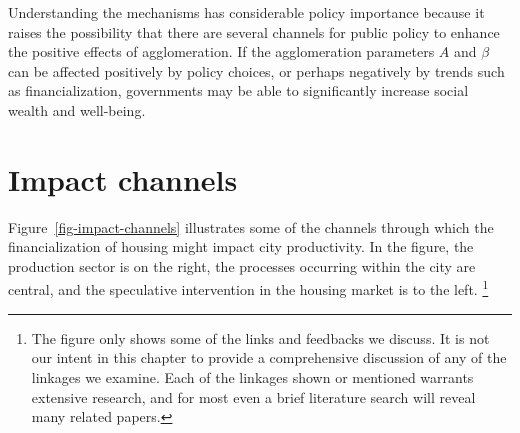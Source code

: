 Understanding the mechanisms has considerable policy importance because it raises the possibility that there are several channels for public policy to enhance the positive effects of agglomeration. If the agglomeration parameters $A$ and  $\beta$ can be affected positively by policy choices, or perhaps negatively by trends such as financialization,  governments may be able to significantly increase social wealth and well-being. 







\section{Impact channels}

Figure~\ref{fig-impact-channels} illustrates some of the channels through which the financialization of housing might impact city productivity. 
In the figure, the production sector is on the right, the processes occurring within the city are central, and the speculative intervention in the housing market is to the left.  \footnote{The figure only shows some of the links and feedbacks we discuss. It is not our intent in this chapter to provide  a comprehensive discussion of any of the linkages we examine. Each of the linkages shown or mentioned warrants extensive research, and for most even a brief literature search will reveal many related papers.} 

